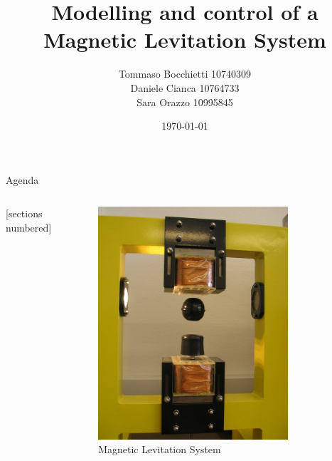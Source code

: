 \documentclass[9pt]{beamer}
\title{Modelling and control of a Magnetic Levitation System}
\date{\today}
\author{Tommaso Bocchietti 10740309 \\ Daniele Cianca 10764733 \\ Sara Orazzo 10995845}
\institute{Politecnico di Milano}
\begin{document}
\maketitle

\begin{frame}{Agenda}

    \begin{columns}[c, onlytextwidth]

        \begin{column}{0.5\textwidth}

            [sections numbered]
            \tableofcontents

        \end{column}

        \begin{column}{0.5\textwidth}

            \begin{figure}[H]
                \centering
                \includegraphics[width=0.8\textwidth]{img/ML2SEM magnetic levitation equipment.jpg}
                \caption{Magnetic Levitation System}
            \end{figure}

        \end{column}

    \end{columns}

\end{frame}
\end{document}
